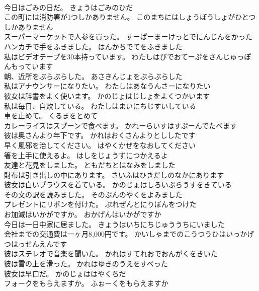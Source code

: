\documentclass[8pt]{extreport}
\begin{document}
\begin{CJK}{UTF8}{min}
\\	今日はごみの日だ。	きょうはごみのひだ 
\\	この町には消防署が1つしかありません。	このまちにはしょうぼうしょがひとつしかありません 
\\	スーパーマーケットで人参を買った。	すーぱーまーけっとでにんじんをかった 
\\	ハンカチで手をふきました。	はんかちでてをふきました 
\\	私はビデオテープを30本持っています。	わたしはびでおてーぷをさんじゅっぽんもっています 
\\	朝、近所をぶらぶらした。	あさきんじょをぶらぶらした 
\\	私はアナウンサーになりたい。	わたしはあなうんさーになりたい 
\\	彼女は辞書をよく使います。	かのじょはじしょをよくつかいます 
\\	私は毎日、自炊している。	わたしはまいにちじすいしている 
\\	車を止めて。	くるまをとめて 
\\	カレーライスはスプーンで食べます。	かれーらいすはすぷーんでたべます 
\\	彼は奥さんより年下です。	かれはおくさんよりとししたです 
\\	早く風邪を治してください。	はやくかぜをなおしてください 
\\	箸を上手に使えるよ。	はしをじょうずにつかえるよ 
\\	友達と花見をしました。	ともだちとはなみをしました 
\\	財布は引き出しの中にあります。	さいふはひきだしのなかにあります 
\\	彼女は白いブラウスを着ている。	かのじょはしろいぶらうすをきている 
\\	その文の訳を読みました。	そのぶんのやくをよみました 
\\	プレゼントにリボンを付けた。	ぷれぜんとにりぼんをつけた 
\\	お加減はいかがですか。	おかげんはいかがですか 
\\	今日は一日中家に居ました。	きょうはいちにちじゅううちにいました 
\\	会社までの交通費は一ヶ月8,000円です。	かいしゃまでのこうつうひはいっかげつはっせんえんです 
\\	彼はステレオで音楽を聞いた。	かれはすてれおでおんがくをきいた 
\\	彼は雪の上を滑った。	かれはゆきのうえをすべった 
\\	彼女は早口だ。	かのじょははやくちだ 
\\	フォークをもらえますか。	ふぉーくをもらえますか 

\end{CJK}
\end{document}
